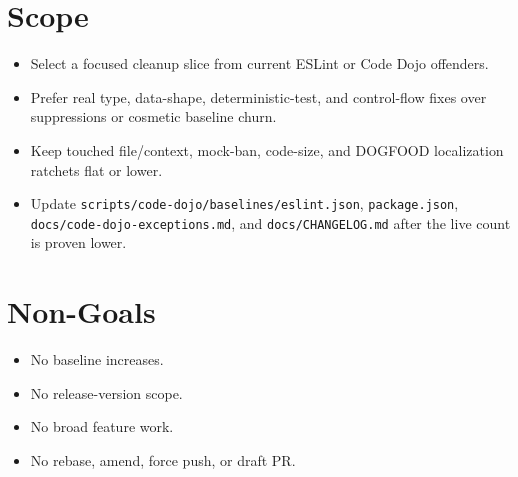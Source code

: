 \section{Scope}\label{record-235-scope}

\begin{itemize}
\tightlist
\item
  Select a focused cleanup slice from current ESLint or Code Dojo offenders.
\item
  Prefer real type, data-shape, deterministic-test, and control-flow fixes over suppressions or cosmetic baseline churn.
\item
  Keep touched file/context, mock-ban, code-size, and DOGFOOD localization ratchets flat or lower.
\item
  Update \texttt{s\allowbreak{}c\allowbreak{}r\allowbreak{}i\allowbreak{}p\allowbreak{}t\allowbreak{}s\allowbreak{}/\allowbreak{}c\allowbreak{}o\allowbreak{}d\allowbreak{}e\allowbreak{}-\allowbreak{}d\allowbreak{}o\allowbreak{}j\allowbreak{}o\allowbreak{}/\allowbreak{}b\allowbreak{}a\allowbreak{}s\allowbreak{}e\allowbreak{}l\allowbreak{}i\allowbreak{}n\allowbreak{}e\allowbreak{}s\allowbreak{}/\allowbreak{}e\allowbreak{}s\allowbreak{}l\allowbreak{}i\allowbreak{}n\allowbreak{}t\allowbreak{}.\allowbreak{}j\allowbreak{}s\allowbreak{}o\allowbreak{}n}, \texttt{p\allowbreak{}a\allowbreak{}c\allowbreak{}k\allowbreak{}a\allowbreak{}g\allowbreak{}e\allowbreak{}.\allowbreak{}j\allowbreak{}s\allowbreak{}o\allowbreak{}n}, \texttt{d\allowbreak{}o\allowbreak{}c\allowbreak{}s\allowbreak{}/\allowbreak{}c\allowbreak{}o\allowbreak{}d\allowbreak{}e\allowbreak{}-\allowbreak{}d\allowbreak{}o\allowbreak{}j\allowbreak{}o\allowbreak{}-\allowbreak{}e\allowbreak{}x\allowbreak{}c\allowbreak{}e\allowbreak{}p\allowbreak{}t\allowbreak{}i\allowbreak{}o\allowbreak{}n\allowbreak{}s\allowbreak{}.\allowbreak{}m\allowbreak{}d}, and \texttt{d\allowbreak{}o\allowbreak{}c\allowbreak{}s\allowbreak{}/\allowbreak{}C\allowbreak{}H\allowbreak{}A\allowbreak{}N\allowbreak{}G\allowbreak{}E\allowbreak{}L\allowbreak{}O\allowbreak{}G\allowbreak{}.\allowbreak{}m\allowbreak{}d} after the live count is proven lower.
\end{itemize}

\section{Non-Goals}\label{record-235-non-goals}

\begin{itemize}
\tightlist
\item
  No baseline increases.
\item
  No release-version scope.
\item
  No broad feature work.
\item
  No rebase, amend, force push, or draft PR.
\end{itemize}


